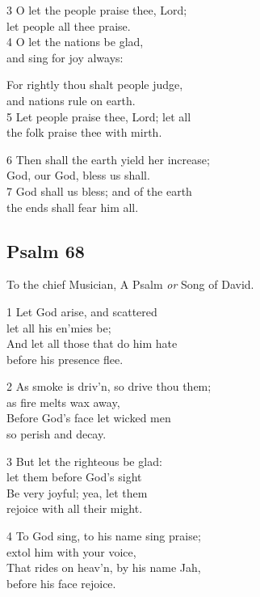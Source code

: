 3 O let the people praise thee, Lord;\\
let people all thee praise.\\
4 O let the nations be glad,\\
and sing for joy always:

For rightly thou shalt people judge,\\
and nations rule on earth.\\
5 Let people praise thee, Lord; let all\\
the folk praise thee with mirth.

6 Then shall the earth yield her increase;\\
God, our God, bless us shall.\\
7 God shall us bless; and of the earth\\
the ends shall fear him all.

\begin{center}
\quad{}\quad{}
\end{center}

\subsection*{Psalm 68}

To the chief Musician,
A Psalm \emph{or} Song of David.

1 Let God arise, and scattered\\
let all his en’mies be;\\
And let all those that do him hate\\
before his presence flee.

2 As smoke is driv’n, so drive thou them;\\
as fire melts wax away,\\
Before God’s face let wicked men\\
so perish and decay.

3 But let the righteous be glad:\\
let them before God’s sight\\
Be very joyful; yea, let them\\
rejoice with all their might.

4 To God sing, to his name sing praise;\\
extol him with your voice,\\
That rides on heav’n, by his name Jah,\\
before his face rejoice.

